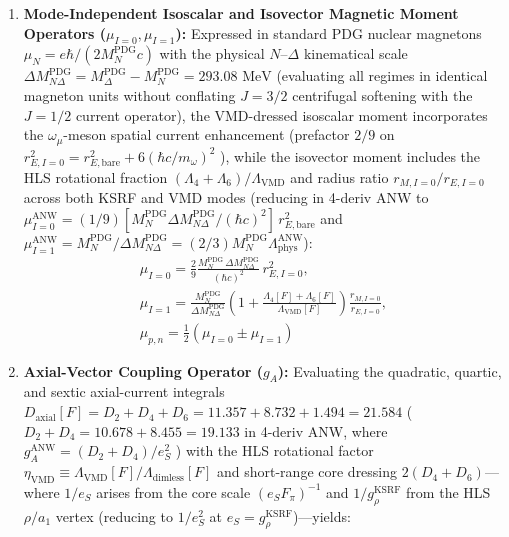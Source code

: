 \documentclass[10pt,aps,prd,twocolumn,superscriptaddress,nofootinbib,floatfix,longbibliography,showkeys]{revtex4-2}
\begin{document}
\begin{enumerate}
\begin{equation}\begin{gathered}
r_{E,\text{bare}} = \frac{\hbar c}{e_S F_\pi}\sqrt{\langle x^2 \rangle_{E,I=0}}, \\
r_{E,I=0} = \sqrt{r_{E,\text{bare}}^2 + \frac{6(\hbar c)^2}{m_\omega^2}}, \\
r_{M,I=0} = \sqrt{r_{M,\text{bare}}^2 + \frac{6(\hbar c)^2}{m_\omega^2}}
\end{gathered}\end{equation}
  \item \textbf{Mode-Independent Isoscalar and Isovector Magnetic Moment Operators ($\mu_{I=0}, \mu_{I=1}$):} Expressed in standard PDG nuclear magnetons $\mu_N = e\hbar / (2 M_N^{\text{PDG}} c)$ with the physical $N$--$\Delta$ kinematical scale $\Delta M_{N\Delta}^{\text{PDG}} = M_\Delta^{\text{PDG}} - M_N^{\text{PDG}} = 293.08\text{ MeV}$ (evaluating all regimes in identical magneton units without conflating $J=3/2$ centrifugal softening with the $J=1/2$ current operator), the VMD-dressed isoscalar moment incorporates the $\omega_\mu$-meson spatial current enhancement (prefactor $2/9$ on $r_{E,I=0}^2 = r_{E,\text{bare}}^2 + 6(\hbar c/m_\omega)^2$ \cite{ref6,ref7,ref8}), while the isovector moment includes the HLS rotational fraction $(\Lambda_4 + \Lambda_6)/\Lambda_{\text{VMD}}$ and radius ratio $r_{M,I=0}/r_{E,I=0}$ across both KSRF and VMD modes (reducing in 4-deriv ANW \cite{ref43} to $\mu_{I=0}^{\text{ANW}} = (1/9)[M_N^{\text{PDG}}\Delta M_{N\Delta}^{\text{PDG}}/(\hbar c)^2]\,r_{E,\text{bare}}^2$ and $\mu_{I=1}^{\text{ANW}} = M_N^{\text{PDG}}/\Delta M_{N\Delta}^{\text{PDG}} = (2/3)M_N^{\text{PDG}}\Lambda_{\text{phys}}^{\text{ANW}}$):
\begin{equation}\begin{gathered}
\mu_{I=0} = \frac{2}{9}\frac{M_N^{\text{PDG}}\,\Delta M_{N\Delta}^{\text{PDG}}}{(\hbar c)^2}\,r_{E,I=0}^2, \\
\mu_{I=1} = \frac{M_N^{\text{PDG}}}{\Delta M_{N\Delta}^{\text{PDG}}}\!\left(1 + \frac{\Lambda_4[F] + \Lambda_6[F]}{\Lambda_{\text{VMD}}[F]}\right)\frac{r_{M,I=0}}{r_{E,I=0}}, \\
\mu_{p,n} = \frac{1}{2}\!\left(\mu_{I=0} \pm \mu_{I=1}\right)
\end{gathered}\end{equation}
  \item \textbf{Axial-Vector Coupling Operator ($g_A$):} Evaluating the quadratic, quartic, and sextic axial-current integrals $D_{\text{axial}}[F] = D_2 + D_4 + D_6 = 11.357 + 8.732 + 1.494 = 21.584$ ($D_2 + D_4 = 10.678 + 8.455 = 19.133$ in 4-deriv ANW, where $g_A^{\text{ANW}} = (D_2 + D_4)/e_S^2$ \cite{ref43}) with the HLS rotational factor $\eta_{\text{VMD}} \equiv \Lambda_{\text{VMD}}[F]/\Lambda_{\text{dimless}}[F]$ and short-range core dressing $2(D_4 + D_6)$---where $1/e_S$ arises from the core scale $(e_S F_\pi)^{-1}$ and $1/g_\rho^{\text{KSRF}}$ from the HLS $\rho/a_1$ vertex \cite{ref6,ref7,ref8} (reducing to $1/e_S^2$ at $e_S = g_\rho^{\text{KSRF}}$)---yields:

\end{enumerate}
\end{document}
